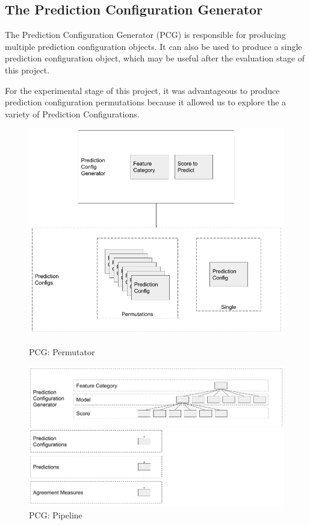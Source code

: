 
\subsection{The Prediction Configuration Generator}
The Prediction Configuration Generator (PCG)  is responsible for producing multiple prediction configuration objects. It can also be used to produce a single prediction configuration object, which may be useful after the evaluation stage of this project. 

For the experimental stage of this project, it was advantageous to produce prediction configuration permutations because it allowed us to explore the a variety of  Prediction Configurations. 

\begin{figure}[h]
   \begin{minipage}{0.48\textwidth}
     \centering
     \includegraphics[width=.7\linewidth]{pngs/pcg-permutations.png}
     \caption{PCG: Permutator}\label{Fig:Data1}
   \end{minipage}\hfill
   \begin{minipage}{0.48\textwidth}
     \centering
     \includegraphics[width=.7\linewidth]{pngs/pcg-tree.png}
     \caption{PCG: Pipeline}\label{Fig:Data2}
   \end{minipage}
\end{figure}